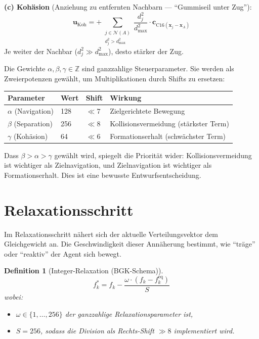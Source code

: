 \documentclass[11pt,a4paper]{article}
\newtheorem{definition}{Definition}
\newcommand{\feq}{f^{\mathrm{eq}}}
\newcommand{\compass}{\mathrm{C16}}
\begin{document}
\textbf{(c) Koh\"asion} (Anziehung zu entfernten Nachbarn --- ``Gummiseil unter Zug''):
\begin{equation}
\mathbf{u}_{\mathrm{Koh}} = +\sum_{\substack{j \in \mathcal{N}(A) \\ d^2_j > d^2_{\max}}}
\frac{d^2_j}{d^2_{\max}} \cdot \mathbf{c}_{\compass(\mathbf{x}_j - \mathbf{x}_A)}
\end{equation}
Je weiter der Nachbar ($d^2_j \gg d^2_{\max}$), desto st\"arker der Zug.

Die Gewichte $\alpha, \beta, \gamma \in \mathbb{Z}$ sind ganzzahlige Steuerparameter.
Sie werden als Zweierpotenzen gew\"ahlt, um Multiplikationen durch Shifts zu ersetzen:

\begin{center}
\begin{tabular}{@{}llll@{}}
\toprule
\textbf{Parameter} & \textbf{Wert} & \textbf{Shift} & \textbf{Wirkung} \\
\midrule
$\alpha$ (Navigation) & 128 & $\ll 7$ & Zielgerichtete Bewegung \\
$\beta$ (Separation) & 256 & $\ll 8$ & Kollisionsvermeidung (st\"arkster Term) \\
$\gamma$ (Koh\"asion) & 64 & $\ll 6$ & Formationserhalt (schw\"achster Term) \\
\bottomrule
\end{tabular}
\end{center}

Dass $\beta > \alpha > \gamma$ gew\"ahlt wird, spiegelt die Priorit\"at wider:
Kollisionsvermeidung ist wichtiger als Zielnavigation, und Zielnavigation
ist wichtiger als Formationserhalt. Dies ist eine bewusste Entwurfsentscheidung.

\section{Relaxationsschritt}\label{sec:collision}

Im Relaxationsschritt n\"ahert sich der aktuelle Verteilungsvektor
dem Gleichgewicht an. Die Geschwindigkeit dieser Ann\"aherung
bestimmt, wie ``tr\"age'' oder ``reaktiv'' der Agent sich bewegt.

\begin{definition}[Integer-Relaxation (BGK-Schema)]
\begin{equation}\label{eq:collision}
f_k^* = f_k - \frac{\omega \cdot (f_k - \feq_k)}{S}
\end{equation}
wobei:
\begin{itemize}[itemsep=2pt]
\item $\omega \in \{1, \ldots, 256\}$ der ganzzahlige Relaxationsparameter ist,
\item $S = 256$, sodass die Division als Rechts-Shift $\gg 8$ implementiert wird.
\end{itemize}
\end{definition}
\end{document}
